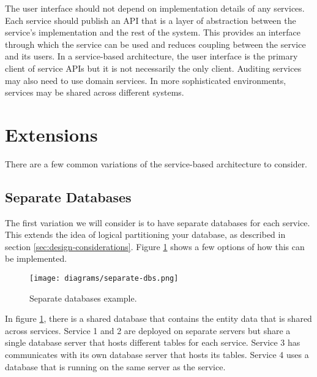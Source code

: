 The user interface should not depend on implementation details of any services.
Each service should publish an API that is a layer of abstraction between the service's implementation and the rest of the system.
This provides an interface through which the service can be used and reduces coupling between the service and its users.
In a service-based architecture, the user interface is the primary client of service APIs but it is not necessarily the only client.
Auditing services may also need to use domain services.
In more sophisticated environments, services may be shared across different systems.


\section{Extensions}

There are a few common variations of the service-based architecture to consider.

\subsection{Separate Databases}

The first variation  we will consider is to have separate databases for each service.
This extends the idea of logical partitioning your database, as described in section \ref{sec:design-considerations}.
Figure \ref{fig:separate-dbs} shows a few options of how this can be implemented.

\begin{figure}[h!]
    \begin{adjustwidth}{-5mm}{-5mm}
        \centering
        \texttt{[image: diagrams/separate-dbs.png]}
    \end{adjustwidth}
    \caption{Separate databases example.}
    \label{fig:separate-dbs}
\end{figure}

In figure \ref{fig:separate-dbs}, there is a shared database that contains the entity data that is shared across services.
Service 1 and 2 are deployed on separate servers but share a single database server that hosts different tables for each service.
Service 3 has communicates with its own database server that hosts its tables.
Service 4 uses a database that is running on the same server as the service.

